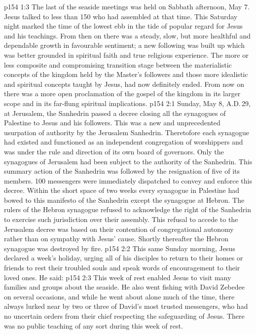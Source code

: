 \vs p154 1:3 The last of the seaside meetings was held on Sabbath afternoon, May 7. Jesus talked to less than 150 who had assembled at that time. This Saturday night marked the time of the lowest ebb in the tide of popular regard for Jesus and his teachings. From then on there was a steady, slow, but more healthful and dependable growth in favourable sentiment; a new following was built up which was better grounded in spiritual faith and true religious experience. The more or less composite and compromising transition stage between the materialistic concepts of the kingdom held by the Master’s followers and those more idealistic and spiritual concepts taught by Jesus, had now definitely ended. From now on there was a more open proclamation of the gospel of the kingdom in its larger scope and in its far\hyp{}flung spiritual implications.
\vs p154 2:1 Sunday, May 8, A.D.\,29, at Jerusalem, the Sanhedrin passed a decree closing all the synagogues of Palestine to Jesus and his followers. This was a new and unprecedented usurpation of authority by the Jerusalem Sanhedrin. Theretofore each synagogue had existed and functioned as an independent congregation of worshippers and was under the rule and direction of its own board of governors. Only the synagogues of Jerusalem had been subject to the authority of the Sanhedrin. This summary action of the Sanhedrin was followed by the resignation of five of its members. 100 messengers were immediately dispatched to convey and enforce this decree. Within the short space of two weeks every synagogue in Palestine had bowed to this manifesto of the Sanhedrin except the synagogue at Hebron. The rulers of the Hebron synagogue refused to acknowledge the right of the Sanhedrin to exercise such jurisdiction over their assembly. This refusal to accede to the Jerusalem decree was based on their contention of congregational autonomy rather than on sympathy with Jesus’ cause. Shortly thereafter the Hebron synagogue was destroyed by fire.
\vs p154 2:2 \pc This same Sunday morning, Jesus declared a week’s holiday, urging all of his disciples to return to their homes or friends to rest their troubled souls and speak words of encouragement to their loved ones. He said: 
\vs p154 2:3 This week of rest enabled Jesus to visit many families and groups about the seaside. He also went fishing with David Zebedee on several occasions, and while he went about alone much of the time, there always lurked near by two or three of David’s most trusted messengers, who had no uncertain orders from their chief respecting the safeguarding of Jesus. There was no public teaching of any sort during this week of rest.
